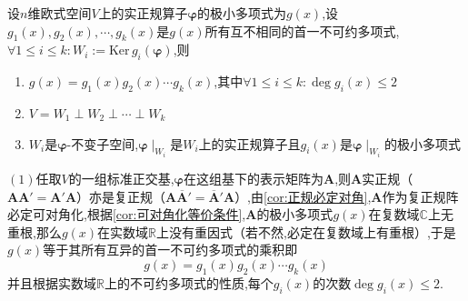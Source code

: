 \begin{formal}
    \begin{theorem}[极小多项式不可约分解引出的正交直和分解]\label{thm:极小多项式不可约分解引出的正交直和分解}
        设$n$维欧式空间$V$上的实正规算子$\bm{\varphi}$的极小多项式为$g\left(x\right)$,设$g_1\left(x\right),g_2\left(x\right),\cdots,g_k\left(x\right)$是$g\left(x\right)$所有互不相同的首一不可约多项式,$\forall1\leqslant i\leqslant k:W_i:=\mathrm{Ker}\,g_i\left(\bm{\varphi}\right)$,则\begin{enumerate}[label={\textup{(\arabic*)}}]
            \item $g\left(x\right)=g_1\left(x\right)g_2\left(x\right)\cdots g_k\left(x\right)$,其中$\forall1\leqslant i\leqslant k:\deg g_i\left(x\right)\leqslant 2$
            \item $V=W_1\perp W_2\perp \cdots\perp W_k$
            \item $W_i$是$\bm{\varphi}$-不变子空间,$\displaystyle\bm{\varphi}\mid_{W_i}$是$W_i$上的实正规算子且$g_i\left(x\right)$是$\displaystyle\bm{\varphi}\mid_{W_i}$的极小多项式
        \end{enumerate}
    \end{theorem}
    \begin{Proof}
        $(1)$任取$V$的一组标准正交基,$\bm{\varphi}$在这组基下的表示矩阵为$\bm{A}$,则$\bm{A}$实正规（$\bm{AA}'=\bm{A}'\bm{A}$）亦是复正规（$\bm{A}\overline{\bm{A}}'=\overline{\bm{A}}'\bm{A}$）,由\cref{cor:正规必定对角},$\bm{A}$作为复正规阵必定可对角化,根据\cref{cor:可对角化等价条件},$\bm{A}$的极小多项式$g\left(x\right)$在复数域$\mathbb{C}$上无重根,那么$g\left(x\right)$在实数域$\mathbb{R}$上没有重因式（若不然,必定在复数域上有重根）,于是$g\left(x\right)$等于其所有互异的首一不可约多项式的乘积即\[
        g\left(x\right)=g_1\left(x\right)g_2\left(x\right)\cdots g_k\left(x\right)
        \]并且根据实数域$\mathbb{R}$上的不可约多项式的性质,每个$g_i\left(x\right)$的次数$\deg g_i\left(x\right)\leqslant 2$.


\end{Proof}
\end{formal}
